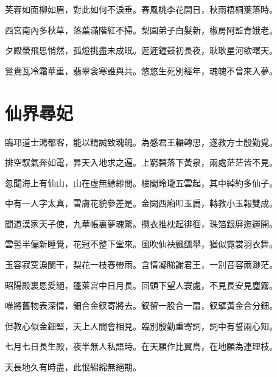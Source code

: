 \documentclass[UTF8]{ctexart}
\begin{document}
芙蓉如面柳如眉，對此如何不淚垂。春風桃李花開日，秋雨梧桐葉落時。

西宮南內多秋草，落葉滿階紅不掃。梨園弟子白髮新，椒房阿監青娥老。

夕殿螢飛思悄然，孤燈挑盡未成眠。遲遲鐘鼓初長夜，耿耿星河欲曙天。

鴛鴦瓦冷霜華重，翡翠衾寒誰與共。悠悠生死別經年，魂魄不曾來入夢。

\section{仙界尋妃}

臨邛道士鴻都客，能以精誠致魂魄。為感君王輾轉思，遂教方士殷勤覓。

排空馭氣奔如電，昇天入地求之遍。上窮碧落下黃泉，兩處茫茫皆不見。

忽聞海上有仙山，山在虛無縹緲間。樓閣玲瓏五雲起，其中綽約多仙子。

中有一人字太真，雪膚花貌參差是。金闕西廂叩玉扃，轉教小玉報雙成。

聞道漢家天子使，九華帳裏夢魂驚。攬衣推枕起徘徊，珠箔銀屏迤邐開。

雲髻半偏新睡覺，花冠不整下堂來。風吹仙袂飄颻舉，猶似霓裳羽衣舞。

玉容寂寞淚闌干，梨花一枝春帶雨。含情凝睇謝君王，一別音容兩渺茫。

昭陽殿裏恩愛絕，蓬萊宮中日月長。回頭下望人寰處，不見長安見塵霧。

唯將舊物表深情，鈿合金釵寄將去。釵留一股合一扇，釵擘黃金合分鈿。

但教心似金鈿堅，天上人間會相見。臨別殷勤重寄詞，詞中有誓兩心知。

七月七日長生殿，夜半無人私語時。在天願作比翼鳥，在地願為連理枝。

天長地久有時盡，此恨綿綿無絕期。
\end{document}
